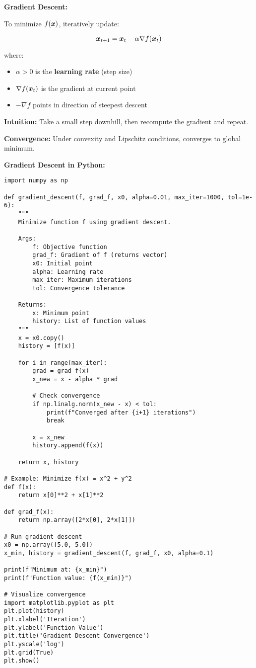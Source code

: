 \begin{seanbox}{6.5}
\textbf{Gradient Descent:}

To minimize $f(\bm{x})$, iteratively update:

\begin{equation}
    \bm{x}_{t+1} = \bm{x}_t - \alpha \nabla f(\bm{x}_t)
\end{equation}

where:
\begin{itemize}
    \item $\alpha > 0$ is the \textbf{learning rate} (step size)
    \item $\nabla f(\bm{x}_t)$ is the gradient at current point
    \item $-\nabla f$ points in direction of steepest descent
\end{itemize}

\textbf{Intuition:} Take a small step downhill, then recompute the gradient and repeat.

\textbf{Convergence:} Under convexity and Lipschitz conditions, converges to global minimum.
\end{seanbox}

\begin{codebox}
\textbf{Gradient Descent in Python:}

\begin{lstlisting}
import numpy as np

def gradient_descent(f, grad_f, x0, alpha=0.01, max_iter=1000, tol=1e-6):
    """
    Minimize function f using gradient descent.
    
    Args:
        f: Objective function
        grad_f: Gradient of f (returns vector)
        x0: Initial point
        alpha: Learning rate
        max_iter: Maximum iterations
        tol: Convergence tolerance
    
    Returns:
        x: Minimum point
        history: List of function values
    """
    x = x0.copy()
    history = [f(x)]
    
    for i in range(max_iter):
        grad = grad_f(x)
        x_new = x - alpha * grad
        
        # Check convergence
        if np.linalg.norm(x_new - x) < tol:
            print(f"Converged after {i+1} iterations")
            break
        
        x = x_new
        history.append(f(x))
    
    return x, history

# Example: Minimize f(x) = x^2 + y^2
def f(x):
    return x[0]**2 + x[1]**2

def grad_f(x):
    return np.array([2*x[0], 2*x[1]])

# Run gradient descent
x0 = np.array([5.0, 5.0])
x_min, history = gradient_descent(f, grad_f, x0, alpha=0.1)

print(f"Minimum at: {x_min}")
print(f"Function value: {f(x_min)}")

# Visualize convergence
import matplotlib.pyplot as plt
plt.plot(history)
plt.xlabel('Iteration')
plt.ylabel('Function Value')
plt.title('Gradient Descent Convergence')
plt.yscale('log')
plt.grid(True)
plt.show()
\end{lstlisting}
\end{codebox}

